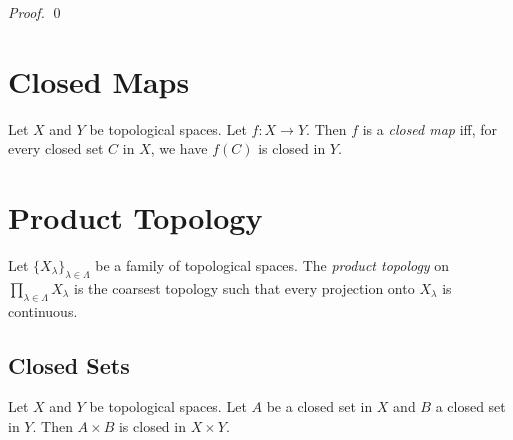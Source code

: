 \begin{proof}
\pf
{}
\qed
\end{proof}

\section{Closed Maps}

\begin{df}
Let $X$ and $Y$ be topological spaces. Let $f : X \rightarrow Y$. Then $f$ is a \emph{closed map} iff, for every closed set $C$ in $X$, we have $f(C)$ is closed in $Y$.
\end{df}

\section{Product Topology}

\begin{df}
Let $\{ X_\lambda \}_{\lambda \in \Lambda}$ be a family of topological spaces. The \emph{product topology} on $\prod_{\lambda \in \Lambda} X_\lambda$ is the coarsest topology such that every projection onto $X_\lambda$ is continuous.
\end{df}

\subsection{Closed Sets}

\begin{prop}
\label{prop:closed_product}
Let $X$ and $Y$ be topological spaces. Let $A$ be a closed set in $X$ and $B$ a closed set in $Y$. Then $A \times B$ is closed in $X \times Y$.
\end{prop}

